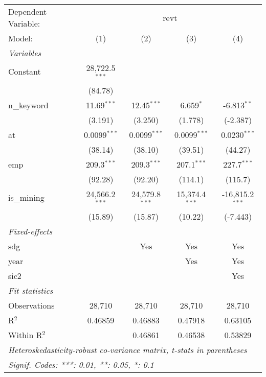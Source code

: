 
\begingroup
\centering
\begin{tabular}{lcccc}
   \tabularnewline \midrule \midrule
   Dependent Variable: & \multicolumn{4}{c}{revt}\\
   Model:       & (1)              & (2)              & (3)              & (4)\\  
   \midrule
   \emph{Variables}\\
   Constant     & 28,722.5$^{***}$ &                  &                  &   \\   
                & (84.78)          &                  &                  &   \\   
   n\_keyword   & 11.69$^{***}$    & 12.45$^{***}$    & 6.659$^{*}$      & -6.813$^{**}$\\   
                & (3.191)          & (3.250)          & (1.778)          & (-2.387)\\   
   at           & 0.0099$^{***}$   & 0.0099$^{***}$   & 0.0099$^{***}$   & 0.0230$^{***}$\\   
                & (38.14)          & (38.10)          & (39.51)          & (44.27)\\   
   emp          & 209.3$^{***}$    & 209.3$^{***}$    & 207.1$^{***}$    & 227.7$^{***}$\\   
                & (92.28)          & (92.20)          & (114.1)          & (115.7)\\   
   is\_mining   & 24,566.2$^{***}$ & 24,579.8$^{***}$ & 15,374.4$^{***}$ & -16,815.2$^{***}$\\   
                & (15.89)          & (15.87)          & (10.22)          & (-7.443)\\   
   \midrule
   \emph{Fixed-effects}\\
   sdg          &                  & Yes              & Yes              & Yes\\  
   year         &                  &                  & Yes              & Yes\\  
   sic2         &                  &                  &                  & Yes\\  
   \midrule
   \emph{Fit statistics}\\
   Observations & 28,710           & 28,710           & 28,710           & 28,710\\  
   R$^2$        & 0.46859          & 0.46883          & 0.47918          & 0.63105\\  
   Within R$^2$ &                  & 0.46861          & 0.46538          & 0.53829\\  
   \midrule \midrule
   \multicolumn{5}{l}{\emph{Heteroskedasticity-robust co-variance matrix, t-stats in parentheses}}\\
   \multicolumn{5}{l}{\emph{Signif. Codes: ***: 0.01, **: 0.05, *: 0.1}}\\
\end{tabular}
\par\endgroup


